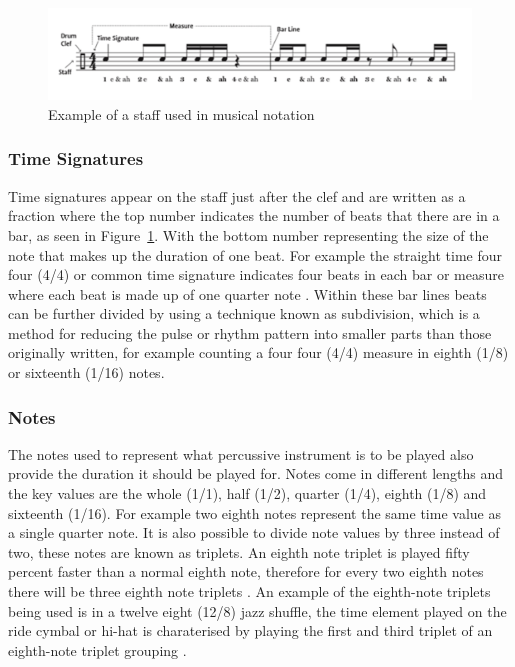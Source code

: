 \documentclass[a4paper, 11pt]{article}
\begin{document}
\begin{figure}
	\centering
	\includegraphics[scale=0.3]{images/staff.jpg}
	\caption{Example of a staff used in musical notation}
	\label{fig: staff}
\end{figure}

\subsubsection{Time Signatures}
Time signatures appear on the staff just after the clef and are written as a fraction where the top number indicates the number of beats that there are in a bar, as seen in Figure~\ref{fig: staff}. With the bottom number representing the size of the note that makes up the duration of one beat. For example the straight time four four (4/4) or common time signature indicates four beats in each bar or measure where each beat is made up of one quarter note \cite{drum-note}. Within these bar lines beats can be further divided by using a technique known as subdivision, which is a method for reducing the pulse or rhythm pattern into smaller parts than those originally written, for example counting a four four (4/4) measure in eighth (1/8) or sixteenth (1/16) notes. 

\subsubsection{Notes}
The notes used to represent what percussive instrument is to be played also provide the duration it should be played for. Notes come in different lengths and the key values are the whole (1/1), half (1/2), quarter (1/4), eighth (1/8) and sixteenth (1/16). For example two eighth notes represent the same time value as a single quarter note. It is also possible to divide note values by three instead of two, these notes are known as triplets. An eighth note triplet is played fifty percent faster than a normal eighth note, therefore for every two eighth notes there will be three eighth note triplets \cite{drum-note}. An example of the eighth-note triplets being used is in a twelve eight (12/8) jazz shuffle, the time element played on the ride cymbal or hi-hat is charaterised by playing the first and third triplet of an eighth-note triplet grouping \cite{drum-bible}.
\end{document}
